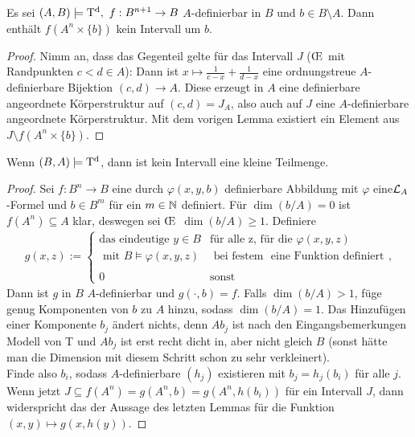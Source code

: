 \newpage

\begin{corollary}
	Es sei $(A,B)\models\td,\ f:B^{n+1}\rightarrow B$ $A$-definierbar in $B$ und $b\in B\setminus A$. Dann enthält $f(A^n\times\{b\})$ kein Intervall um $b$.
\end{corollary}
\begin{proof}
	Nimm an, dass das Gegenteil gelte für das Intervall $J$ (\OE\ mit Randpunkten $c<d\in A$): Dann ist $x\mapsto\frac{1}{c-x}+\frac{1}{d-x}$ eine ordnungstreue $A$-definierbare Bijektion $(c,d)\rightarrow A$. Diese erzeugt in $A$ eine definierbare angeordnete Körperstruktur auf $(c,d)=J_A$, also auch auf $J$ eine $A$-definierbare angeordnete Körperstruktur. Mit dem vorigen Lemma existiert ein Element aus $J\setminus f(A^n\times\{b\})$.
\end{proof}

\begin{theorem}\label{Kleinheit}
	Wenn $(B,A)\models\operatorname{T^d}$, dann ist kein Intervall eine kleine Teilmenge.
\end{theorem}
\begin{proof}
	Sei $f:B^n\rightarrow B$ eine durch $\varphi(x,y,b)$ definierbare Abbildung mit $\varphi$ eine\linebreak$\mathcal{L}_A$-Formel und $b\in B^m$ für ein $m\in\mathbb{N}$ definiert. Für $\dim(b/A)=0$ ist $f(A^n)\subseteq A$ klar, deswegen sei \OE\ $\dim(b/A)\geq1$. Definiere
	\begin{align*}
	g(x,z):=\left\{\begin{array}{ll}
	\text{das eindeutige }y\in B &\text{für alle z, für die }\varphi(x,y,z)\\
	\text{ mit }B\models\varphi(x,y,z) &\text{ bei festem }\text{ eine Funktion definiert}\\
	\ &\ \\
	0 &\text{sonst}
	\end{array}\right.,
	\end{align*}
	Dann ist $g$ in $B$ $A$-definierbar und $g(\cdot,b)=f$. Falls $\dim(b/A)>1$, füge genug Komponenten von $b$ zu $A$ hinzu, sodass $\dim(b/A)=1$. Das Hinzufügen einer Komponente $b_j$ ändert nichts, denn $Ab_j$ ist nach den Eingangsbemerkungen Modell von T und $Ab_j$ ist erst recht dicht in, aber nicht gleich $B$ (sonst hätte man die Dimension mit diesem Schritt schon zu sehr verkleinert).\\
	Finde also $b_i$, sodass $A$-definierbare $(h_j)$ existieren mit $b_j=h_j(b_i)$ für alle $j$. Wenn jetzt $J\subseteq f(A^n)=g(A^n,b)=g(A^n,h(b_i))$ für ein Intervall $J$, dann widerspricht das der Aussage des letzten Lemmas für die Funktion $(x,y)\mapsto g(x,h(y))$.
\end{proof}

